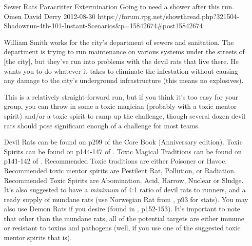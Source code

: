 \begin{scenario}{Sewer Rats}
	{Paracritter Extermination}
	{Going to need a shower after this run.}
	{Omen David Derry}
	{2012-08-30}
	{https://forum.rpg.net/showthread.php?321504-Shadowrun-4th-101-Instant-Scenarios\&p=15842674#post15842674}

William Smith works for the city's department of sewers and sanitation. The department is trying to run maintenance on various systems under the streets of [the city], but they've run into problems with the devil rats that live there. He wants you to do whatever it takes to eliminate the infestation without causing any damage to the city's underground infrastructure (this means no explosives).

\synopsis
This is a relatively straight-forward run, but if you think it's too easy for your group, you can throw in some a toxic magician (probably with a toxic mentor spirit) and/or a toxic spirit to ramp up the challenge, though several dozen devil rats should pose significant enough of a challenge for most teams.

\notes
Devil Rats can be found on p299 of the Core Book (Anniversary edition). Toxic Spirits can be found on p144-147 of . Toxic Magical Traditions can be found on p141-142 of . Recommended Toxic traditions are either Poisoner or Havoc. Recommended toxic mentor spirits are Pestilent Rat, Pollution, or Radiation. Recommended Toxic Spirits are Abomination, Acid, Harrow, Nuclear or Sludge. It's also suggested to have a \textit{minimum} of 4:1 ratio of devil rats to runners, and a ready supply of mundane rats (use Norwegian Rat from , p93 for stats). You may also use Demon Rats if you desire (found in , p152-153). It's important to note that other than the mundane rats, all of the potential targets are either immune or resistant to toxins and pathogens (well, if you use one of the suggested toxic mentor spirits that is).

\end{scenario}
